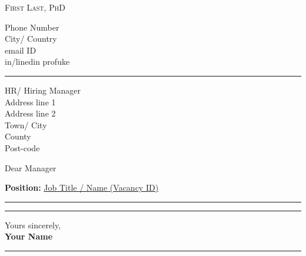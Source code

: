 \documentclass[11pt, a4paper, roman]{letter}
\begin{document}
\pagestyle{empty}
\raggedbottom

\begin{minipage}[t]{0.5\textwidth}
    \vspace*{\fill}
    \textsc{{\Huge First Last}, {\LARGE PhD}} %
    \vspace*{\fill}
\end{minipage}\hfill
\begin{minipage}[t]{0.3\textwidth}
    \setlength{\baselineskip}{15pt}
    \RaggedLeft 
    \faMobile{} Phone Number\\
    \faHome{} City/ Country\\ 
    \faEnvelope {} email ID\\ 
    \faLinkedinSquare{} in/linedin profuke
\end{minipage}

{\color{cvteal} \rule{\linewidth}{1mm}}

\begin{minipage}[t]{\textwidth}

    \begin{letter} {HR/ Hiring Manager\\Address line 1\\
Address line 2\\Town/ City\\County\\Post-code} %
\setlength{\parskip}{5pt} %
\setlength{\baselineskip}{15pt} %
    \opening{Dear Manager}

    \begin{center} {\textbf{Position:} \underline{Job Title / Name (Vacancy ID)}} \end{center}

\setlength{\parskip}{20pt}

\justifying{
\lipsum[1-4]
}   
\end{letter}
\end{minipage}

\vspace*{\fill}
{\color{cvteal} \rule{\linewidth}{1mm}}

\newpage

\newpage
{\color{cvteal} \rule{\linewidth}{1mm}}

{
\setlength{\parskip}{10pt}
\setlength{\parindent}{10pt}
\setlength{\baselineskip}{15pt}

\lipsum[1-7]
}

Yours sincerely,\\\textbf{Your Name}

\vspace*{\fill}

{\color{cvteal} \rule{\linewidth}{1mm}}
\end{document}
